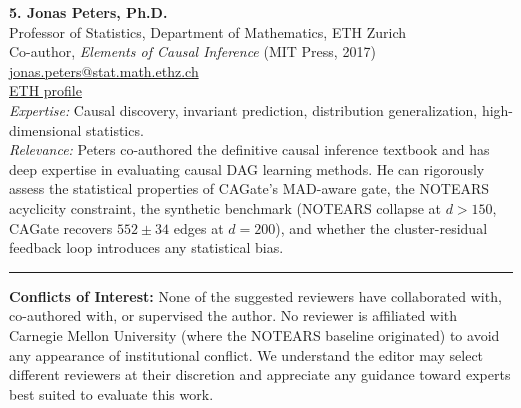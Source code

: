 \documentclass[12pt]{article}
\begin{document}
\noindent\textbf{5. Jonas Peters, Ph.D.}\\
Professor of Statistics, Department of Mathematics, ETH Zurich\\
Co-author, \textit{Elements of Causal Inference} (MIT Press, 2017)\\
\href{mailto:jonas.peters@stat.math.ethz.ch}{jonas.peters@stat.math.ethz.ch}\\
\href{https://people.math.ethz.ch/~jopeters/}{ETH profile}\\[4pt]
\textit{Expertise:} Causal discovery, invariant prediction, distribution generalization, high-dimensional statistics.\\
\textit{Relevance:} Peters co-authored the definitive causal inference textbook and has deep expertise in evaluating causal DAG learning methods. He can rigorously assess the statistical properties of CAGate's MAD-aware gate, the NOTEARS acyclicity constraint, the synthetic benchmark (NOTEARS collapse at $d > 150$, CAGate recovers $552 \pm 34$ edges at $d = 200$), and whether the cluster-residual feedback loop introduces any statistical bias.

\vspace{0.8cm}

\noindent\rule{\textwidth}{0.5pt}
\vspace{0.3cm}

\noindent\textbf{Conflicts of Interest:} None of the suggested reviewers have collaborated with, co-authored with, or supervised the author. No reviewer is affiliated with Carnegie Mellon University (where the NOTEARS baseline originated) to avoid any appearance of institutional conflict. We understand the editor may select different reviewers at their discretion and appreciate any guidance toward experts best suited to evaluate this work.
\end{document}
